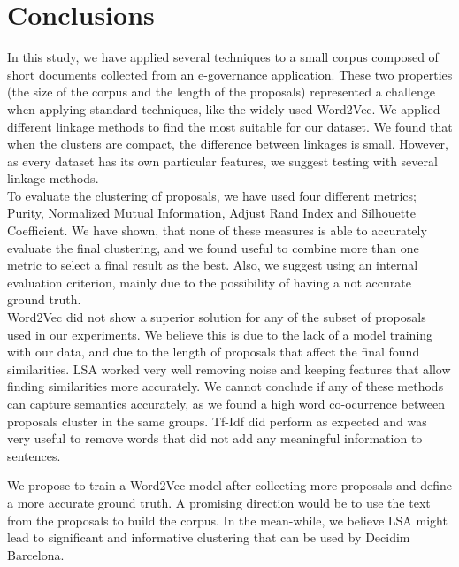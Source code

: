 \chapter{Conclusions}
 In this study, we have applied several techniques to a small corpus composed of short documents collected from an e-governance application. These two properties (the size of the corpus and the length of the proposals) represented a challenge when applying standard techniques, like the widely used Word2Vec. We applied different linkage methods to find the most suitable for our dataset. We found that when the clusters are compact, the difference between linkages is small. However, as every dataset has its own particular features, we suggest testing with several linkage methods.\\

To evaluate the clustering of proposals, we have used four different metrics; Purity, Normalized Mutual Information, Adjust Rand Index and Silhouette Coefficient. We have shown, that none of these measures is able to accurately evaluate the final clustering, and we found useful to combine more than one metric to select a final result as the best. Also, we suggest using an internal evaluation criterion, mainly due to the possibility of having a not accurate ground truth. \\

Word2Vec did not show a superior solution for any of the subset of proposals used in our experiments. We believe this is due to the lack of a model training with our data, and due to the length of proposals that affect the final found similarities. LSA worked very well removing noise and keeping features that allow finding similarities more accurately. We cannot conclude if any of these methods can capture semantics accurately, as we found a high word co-ocurrence between proposals cluster in the same groups. Tf-Idf did perform as expected and was very useful to remove words that did not add any meaningful information to sentences. 

We propose to train a Word2Vec model after collecting more proposals and define a more accurate ground truth. A promising direction would be to use the text from the proposals to build the corpus. In the mean-while, we believe LSA might lead to significant and informative clustering that can be used by Decidim Barcelona.
\newpage

